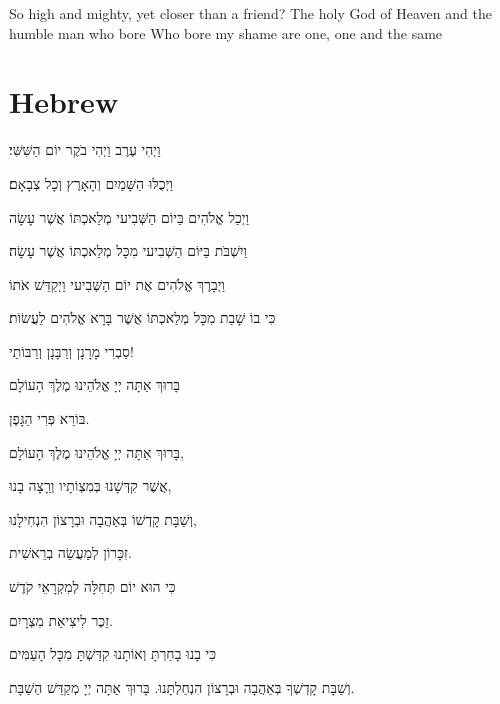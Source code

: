 \documentclass[10pt,oneside,footinclude=true,headinclude=true]{scrbook} %
\begin{document}
So high and mighty, yet closer than a friend?
The holy God of Heaven and the humble man who bore
Who bore my shame are one, one and the same

\chapter{Hebrew}

וַיְהִי עֶרֶב וַיְהִי בֹקֶר יוֹם הַשִּׁשִּׁי׃

וַיְכֻלּוּ הַשָּׁמַיִם וְהָאָרֶץ וְכָל צְבָאָם׃

וַיְכַל אֱלֹהִים בַּיוֹם הַשְּׁבִיעי מְלַאכְתּוֹ אֲשֶׁר עָשָׂה

וַיִשְׁבֹּת בַּיּוֹם הַשְּׁבִיעי מִכָּל מְלַאכְתּוֹ אֲשֶׁר עָשָׂה׃

וַיְבָרֶךְ אֱלֹהִים אֶת יוֹם הַשְּׁבִיעי וַיְקַדֵּשׁ אֹתוֹ

כִּי בוֹ שָׁבַת מִכָּל מְלַאכְתּוֹ אֲשֶׁר בָּרָא אֱלֹהִים לַעֲשׂוֹת׃

סַבְרִי מָרָנָן וְרַבָּנָן וְרַבּוֹתַי!

בָּרוּךְ אַתָּה יְיָ אֱלֹהֵינוּ מֶלֶךְ הָעוֹלָם

בּוֹרֵא פְּרִי הַגָּפֶן.

בָּרוּךְ אַתָּה יְיָ אֱלֹהֵינוּ מֶלֶךְ הָעוֹלָם,

אֲשֶׁר קִדְּשָׁנוּ בְּמִצְוֹתָיו וְרַָצָה בָנוּ,

וְשַׁבָּת קָדְשׁוֹ בְּאַהֲבָה וּבְרָצוֹן הִנְחִילָנוּ,

זִכָּרוֹן לְמַעֲשֵׂה בְרֵאשִׁית.

כִּי הוּא יוֹם תְּחִלָּה לְמִקְרָאֵי קֹדֶשׁ

זֵכֶר לִיצִיאַת מִצְרָיִם.

כִּי בָנוּ בָחַרְתָּ וְאוֹתָנוּ קִדַּשְׁתָּ מִכָּל הָעַמִּים

וְשַׁבָּת קָדְשְׁךָ בְּאַהֲבָה וּבְרָצוֹן הִנְחַלְתָּנוּ.
בָּרוּךְ אַתָּה יְיָ מְקַדֵּשׁ הַשַׁבָּת.
\end{document}
